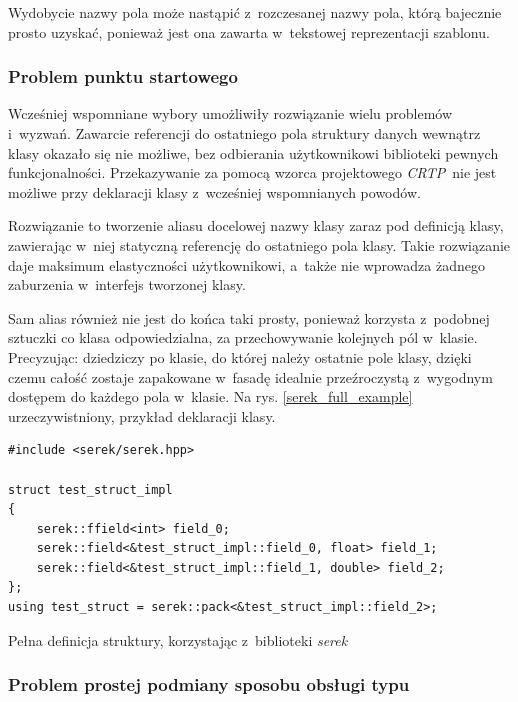 \documentclass[12pt]{article}
\newcommand{\n}{\newline}
\newcommand{\nonpl}[1]{{\it #1}}
\newcommand{\CRTP}{\nonpl{CRTP}}
\newcommand{\serek}{\nonpl{serek}}
\begin{document}
{{{				Wydobycie nazwy pola może nastąpić z~rozczesanej nazwy pola, którą bajecznie prosto uzyskać, ponieważ jest ona zawarta
				w~tekstowej reprezentacji szablonu.
			}

			{
				\subsubsection{Problem punktu startowego}

				Wcześniej wspomniane wybory umożliwiły rozwiązanie wielu problemów i~wyzwań. Zawarcie referencji do ostatniego pola
				struktury danych wewnątrz klasy okazało się nie możliwe, bez odbierania użytkownikowi biblioteki pewnych funkcjonalności.
				Przekazywanie za pomocą wzorca projektowego \CRTP~nie jest możliwe przy deklaracji klasy z~wcześniej wspomnianych powodów.\n

				Rozwiązanie to tworzenie aliasu docelowej nazwy klasy zaraz pod definicją klasy, zawierając w~niej statyczną referencję do ostatniego pola klasy.
				Takie rozwiązanie daje maksimum elastyczności użytkownikowi, a~także nie wprowadza żadnego zaburzenia w~interfejs tworzonej klasy.\n

				Sam alias również nie jest do końca taki prosty, ponieważ korzysta z~podobnej sztuczki co klasa odpowiedzialna, za przechowywanie
				kolejnych pól w~klasie. Precyzując: dziedziczy po klasie, do której należy ostatnie pole klasy, dzięki czemu całość zostaje
				zapakowane w~fasadę idealnie przeźroczystą z~wygodnym dostępem do każdego pola w~klasie. Na rys. \ref{serek_full_example} urzeczywistniony,
				przykład deklaracji klasy.\n

				\begin{captioned}[H]
					\begin{lstlisting}[frame=single]
#include <serek/serek.hpp>

struct test_struct_impl
{
	serek::ffield<int> field_0;
	serek::field<&test_struct_impl::field_0, float> field_1;
	serek::field<&test_struct_impl::field_1, double> field_2;
};
using test_struct = serek::pack<&test_struct_impl::field_2>;
					\end{lstlisting}
					\caption{ Pełna definicja struktury, korzystając z~biblioteki \serek}
					\label{serek_full_example}
				\end{captioned}
			}

			{
				\subsubsection{Problem prostej podmiany sposobu obsługi typu}

}}}
\end{document}
